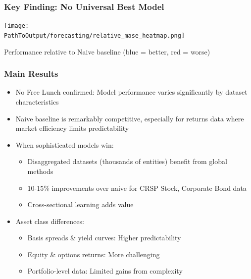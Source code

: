 \documentclass[ignorenonframetext, 9pt]{beamer}
\begin{document}
\begin{frame}
  \frametitle{Key Finding: No Universal Best Model}
  \centering
  \texttt{[image: \\PathToOutput/forecasting/relative\_mase\_heatmap.png]}
  \vspace{0.2cm}

  Performance relative to Naive baseline (blue = better, red = worse)
\end{frame}

\begin{frame}
  \frametitle{Main Results}
  \begin{itemize}
  \item \alert{No Free Lunch confirmed:} Model performance varies significantly by dataset characteristics
  \vspace{0.3cm}
  \item \alert{Naive baseline is remarkably competitive}, especially for returns data where market efficiency limits predictability
  \vspace{0.3cm}
  \item \alert{When sophisticated models win:}
  \begin{itemize}
    \item Disaggregated datasets (thousands of entities) benefit from global methods
    \item 10-15\% improvements over naive for CRSP Stock, Corporate Bond data
    \item Cross-sectional learning adds value
  \end{itemize}
  \vspace{0.3cm}
  \item \alert{Asset class differences:}
  \begin{itemize}
    \item Basis spreads \& yield curves: Higher predictability
    \item Equity \& options returns: More challenging
    \item Portfolio-level data: Limited gains from complexity
  \end{itemize}
  \end{itemize}
\end{frame}
\end{document}
